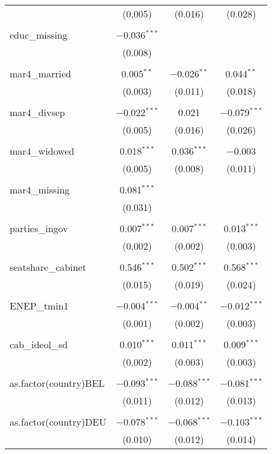 \begin{table}[!htbp]
\begin{tabular}{@{\extracolsep{5pt}}lccc}
  & (0.005) & (0.016) & (0.028) \\ 
  & & & \\ 
 educ\_missing & $-$0.036$^{***}$ &  &  \\ 
  & (0.008) &  &  \\ 
  & & & \\ 
 mar4\_married & 0.005$^{**}$ & $-$0.026$^{**}$ & 0.044$^{**}$ \\ 
  & (0.003) & (0.011) & (0.018) \\ 
  & & & \\ 
 mar4\_divsep & $-$0.022$^{***}$ & 0.021 & $-$0.079$^{***}$ \\ 
  & (0.005) & (0.016) & (0.026) \\ 
  & & & \\ 
 mar4\_widowed & 0.018$^{***}$ & 0.036$^{***}$ & $-$0.003 \\ 
  & (0.005) & (0.008) & (0.011) \\ 
  & & & \\ 
 mar4\_missing & 0.081$^{***}$ &  &  \\ 
  & (0.031) &  &  \\ 
  & & & \\ 
 parties\_ingov & 0.007$^{***}$ & 0.007$^{***}$ & 0.013$^{***}$ \\ 
  & (0.002) & (0.002) & (0.003) \\ 
  & & & \\ 
 seatshare\_cabinet & 0.546$^{***}$ & 0.502$^{***}$ & 0.568$^{***}$ \\ 
  & (0.015) & (0.019) & (0.024) \\ 
  & & & \\ 
 ENEP\_tmin1 & $-$0.004$^{***}$ & $-$0.004$^{**}$ & $-$0.012$^{***}$ \\ 
  & (0.001) & (0.002) & (0.003) \\ 
  & & & \\ 
 cab\_ideol\_sd & 0.010$^{***}$ & 0.011$^{***}$ & 0.009$^{***}$ \\ 
  & (0.002) & (0.003) & (0.003) \\ 
  & & & \\ 
 as.factor(country)BEL & $-$0.093$^{***}$ & $-$0.088$^{***}$ & $-$0.081$^{***}$ \\ 
  & (0.011) & (0.012) & (0.013) \\ 
  & & & \\ 
 as.factor(country)DEU & $-$0.078$^{***}$ & $-$0.068$^{***}$ & $-$0.103$^{***}$ \\ 
  & (0.010) & (0.012) & (0.014) \\ 

\end{tabular}
\end{table}
